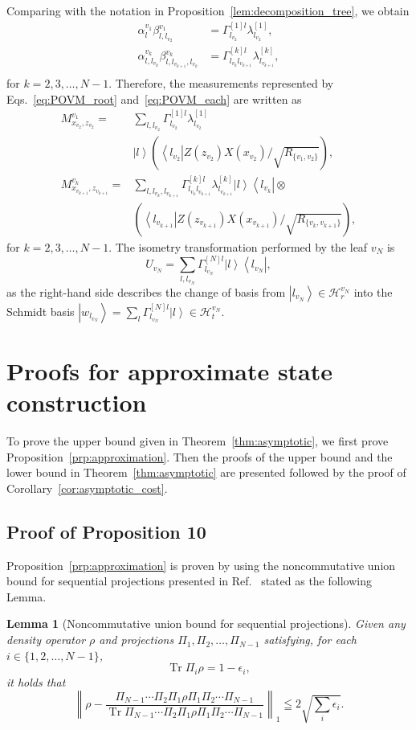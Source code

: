 \documentclass[preprintnumbers,aps,amsmath,amssymb,pra,twocolumn,showpacs,superscriptaddress,floatfix]{revtex4-1}
\def\Bra#1{\left\langle#1\right|}
\def\Ket#1{\left|#1\right\rangle}
\DeclareMathOperator{\tr}{Tr}
\theoremstyle{plain}
\newtheorem{lemma}[theorem]{Lemma}
\theoremstyle{definition}
\theoremstyle{remark}
\begin{document}
Comparing with the notation in Proposition~\ref{lem:decomposition_tree}, we obtain
\begin{align*}
    \alpha^{v_1}_l\beta_{l,l_{v_2}}^{v_1}&=\Gamma_{l_{v_2}}^{[1]l}\lambda_{l_{v_2}}^{[1]},\\
    \alpha^{v_k}_{l,l_{v_k}}\beta_{l,l_{v_{k+1}},l_{v_k}}^{v_k}&=\Gamma_{l_{v_k}l_{v_{k+1}}}^{[k]l}\lambda_{l_{v_{k+1}}}^{[k]},\\
\end{align*}
for $k=2,3,\ldots,N-1$.
Therefore, the measurements represented by Eqs.~\eqref{eq:POVM_root} and~\eqref{eq:POVM_each} are written as
\begin{align*}
    M^{v_1}_{x_{v_2},z_{v_2}}=& \sum_{l,l_{v_2}}\Gamma_{l_{v_2}}^{[1]l}\lambda_{l_{v_2}}^{[1]}\\
                              & \Ket{l}\left(\Bra{l_{v_2}} Z(z_{v_2}) X(x_{v_2})/\sqrt{R_{\{v_1,v_2\}}}\right),\\
    M^{v_k}_{x_{v_{k+1}},z_{v_{k+1}}}=& \sum_{l,l_{v_k},l_{v_{k+1}}}\Gamma_{l_{v_k}l_{v_{k+1}}}^{[k]l}\lambda_{l_{v_{k+1}}}^{[k]} \Ket{l}
    \Bra{l_{v_k}} \otimes\\
    &\left(\Bra{l_{v_{k+1}}}Z(z_{v_{k+1}}) X(x_{v_{k+1}})/\sqrt{R_{\{v_k,v_{k+1}\}}}\right),
\end{align*}
for $k=2,3,\ldots,N-1$.
The isometry transformation performed by the leaf $v_N$ is
\[
    U_{v_N}=\sum_{l,l_{v_N}}\Gamma_{l_{v_N}}^{[N]l}\Ket{l}\Bra{l_{v_N}},
\]
as the right-hand side describes the change of basis from $\Ket{l_{v_N}}\in\mathcal{H}^{v_N}_r$ into the Schmidt basis $\Ket{w_{l_{v_N}}}=\sum_{l}\Gamma_{l_{v_N}}^{[N]l}\Ket{l}\in\mathcal{H}^{v_N}_t$.






\section{\label{app:b}Proofs for approximate state construction}
To prove the upper bound given in Theorem~\ref{thm:asymptotic}, we first prove Proposition~\ref{prp:approximation}.  Then the proofs of the upper bound and the lower bound in Theorem~\ref{thm:asymptotic} are presented followed by the proof of Corollary~\ref{cor:asymptotic_cost}.

\subsection{Proof of Proposition 10}
Proposition~\ref{prp:approximation} is proven by using the noncommutative union bound for sequential projections presented 
in Ref.~\cite{pra052331} stated as the following Lemma.
\begin{lemma}[Noncommutative union bound for sequential projections]
\label{lem:union_bound}
    Given any density operator $\rho$ and projections $\Pi_1,\Pi_2,\ldots,\Pi_{N-1}$ satisfying, for each $i\in\{1,2,\ldots,N-1\}$,
    \[
        \tr\Pi_i\rho=1-\epsilon_i,
    \]
    it holds that
    \[
        \left\|\rho-\frac{\Pi_{N-1}\cdots\Pi_2\Pi_1\rho\Pi_1\Pi_2\cdots\Pi_{N-1}}{\tr\Pi_{N-1}\cdots\Pi_2\Pi_1\rho\Pi_1\Pi_2\cdots\Pi_{N-1}}\right\|_1\leqq 2\sqrt{\sum_i \epsilon_i}.
    \]
\end{lemma}
\end{document}
